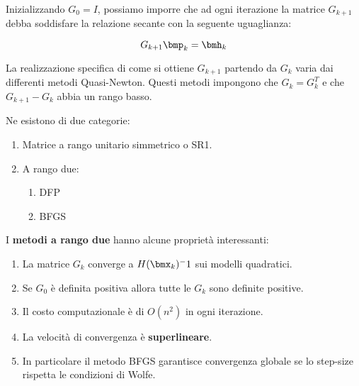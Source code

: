 \documentclass[\main/main.tex]{subfiles}
\begin{document}
Inizializzando \(G_0 = I\), possiamo imporre che ad ogni iterazione la matrice \(G_{k+1}\) debba soddisfare la relazione secante con la seguente uguaglianza:

\[
    G_{k+1}\bmp_k = \bmh_k
\]

La realizzazione specifica di come si ottiene \(G_{k+1}\) partendo da \(G_k\) varia dai differenti metodi Quasi-Newton. Questi metodi impongono che \(G_k = G_k^T\) e che \(G_{k+1} - G_k\) abbia un rango basso.

Ne esistono di due categorie:

\begin{enumerate}
    \item Matrice a rango unitario simmetrico o SR1.
    \item A rango due:
          \begin{enumerate}
              \item DFP
              \item BFGS
          \end{enumerate}
\end{enumerate}

I \textbf{metodi a rango due} hanno alcune proprietà interessanti:

\begin{enumerate}
    \item La matrice \(G_k\) converge a \(H(\bmx_k)^-1\) sui modelli quadratici.
    \item Se \(G_0\) è definita positiva allora tutte le \(G_k\) sono definite positive.
    \item Il costo computazionale è di \(O(n^2)\) in ogni iterazione.
    \item La velocità di convergenza è \textbf{superlineare}.
    \item In particolare il metodo BFGS garantisce convergenza globale se lo step-size rispetta le condizioni di Wolfe.
\end{enumerate}
\end{document}
